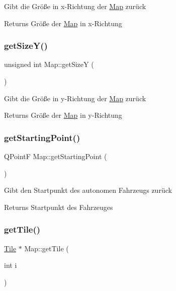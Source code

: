 Gibt die Größe in x-\/\+Richtung der \mbox{\hyperlink{class_map}{Map}} zurück \begin{DoxyReturn}{Returns}
Größe der \mbox{\hyperlink{class_map}{Map}} in x-\/\+Richtung 
\end{DoxyReturn}
\mbox{\label{class_map_a07c437bb06a96676d6a732a559d3df4f}} 
\subsubsection{\texorpdfstring{get\+Size\+Y()}{getSizeY()}}
{\footnotesize\ttfamily unsigned int Map\+::get\+SizeY (\begin{DoxyParamCaption}{ }\end{DoxyParamCaption})}

Gibt die Größe in y-\/\+Richtung der \mbox{\hyperlink{class_map}{Map}} zurück \begin{DoxyReturn}{Returns}
Größe der \mbox{\hyperlink{class_map}{Map}} in y-\/\+Richtung 
\end{DoxyReturn}
\mbox{\label{class_map_a378b0d0c136bd92b080d206f3bc2cd00}} 
\subsubsection{\texorpdfstring{get\+Starting\+Point()}{getStartingPoint()}}
{\footnotesize\ttfamily Q\+PointF Map\+::get\+Starting\+Point (\begin{DoxyParamCaption}{ }\end{DoxyParamCaption})}

Gibt den Startpunkt des autonomen Fahrzeugs zurück \begin{DoxyReturn}{Returns}
Startpunkt des Fahrzeuges 
\end{DoxyReturn}
\mbox{\label{class_map_a60bdbaac9468f1ceb427e38db3eb46a0}} 
\subsubsection{\texorpdfstring{get\+Tile()}{getTile()}}
{\footnotesize\ttfamily \mbox{\hyperlink{class_tile}{Tile}} $\ast$ Map\+::get\+Tile (\begin{DoxyParamCaption}\item[{int}]{i }\end{DoxyParamCaption})}

